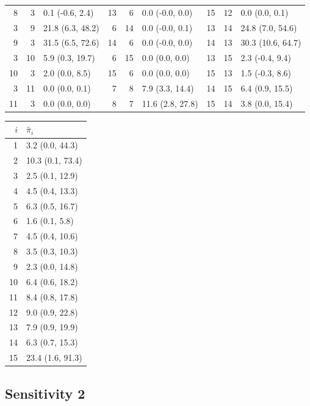 \begin{table}
\begin{tabular}{|rrl||rrl||rrl|}
 8 & 3 & 0.1 (-0.6, 2.4) & 13 & 6 & 0.0 (-0.0, 0.0) & 15 & 12 & 0.0 (0.0, 0.1) \\
 3 & 9 & 21.8 (6.3, 48.2) & 6 & 14 & 0.0 (-0.0, 0.1) & 13 & 14 & 24.8 (7.0, 54.6) \\
 9 & 3 & 31.5 (6.5, 72.6) & 14 & 6 & 0.0 (-0.0, 0.0) & 14 & 13 & 30.3 (10.6, 64.7) \\
 3 & 10 & 5.9 (0.3, 19.7) & 6 & 15 & 0.0 (0.0, 0.0) & 13 & 15 & 2.3 (-0.4, 9.4) \\
 10 & 3 & 2.0 (0.0, 8.5) & 15 & 6 & 0.0 (0.0, 0.0) & 15 & 13 & 1.5 (-0.3, 8.6) \\
 3 & 11 & 0.0 (0.0, 0.1) & 7 & 8 & 7.9 (3.3, 14.4) & 14 & 15 & 6.4 (0.9, 15.5) \\
 11 & 3 & 0.0 (0.0, 0.0) & 8 & 7 & 11.6 (2.8, 27.8) & 15 & 14 & 3.8 (0.0, 15.4) \\
 \hline
 \end{tabular}
\end{table}

\begin{table}
 \centering
 \label{tab:base_case_stat_dist}
 \begin{tabular}{|rl|}
 \hline
 $i$ & $\tilde{\pi_{i}}$ \\
 \hline\hline
 1 & 3.2 (0.0, 44.3) \\
 2 & 10.3 (0.1, 73.4) \\
 3 & 2.5 (0.1, 12.9) \\
 4 & 4.5 (0.4, 13.3) \\
 5 & 6.3 (0.5, 16.7) \\
 6 & 1.6 (0.1, 5.8) \\
 7 & 4.5 (0.4, 10.6) \\
 8 & 3.5 (0.3, 10.3) \\
 9 & 2.3 (0.0, 14.8) \\
 10 & 6.4 (0.6, 18.2) \\
 11 & 8.4 (0.8, 17.8) \\
 12 & 9.0 (0.9, 22.8) \\
 13 & 7.9 (0.9, 19.9) \\
 14 & 6.3 (0.7, 15.3) \\
 15 & 23.4 (1.6, 91.3) \\
 \hline
 \end{tabular}
\end{table}

\subsection{Sensitivity 2}

